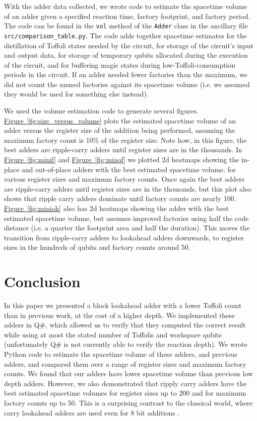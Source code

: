 \documentclass[onecolumn,unpublished]{quantumarticle}
\theoremstyle{definition}
\theoremstyle{definition}
\theoremstyle{definition}
\newcommand{\fig}[1]{\hyperref[fig:#1]{Figure~\ref*{fig:#1}}}
\begin{document}
With the adder data collected, we wrote code to estimate the spacetime volume of an adder given a specified reaction time, factory footprint, and factory period.
The code can be found in the \texttt{vol} method of the \texttt{Adder} class in the ancillary file \texttt{src/comparison\_table.py}.
The code adds together spacetime estimates for the distillation of Toffoli states needed by the circuit, for storage of the circuit's input and output data, for storage of temporary qubits allocated during the execution of the circuit, and for buffering magic states during low-Toffoli-consumption periods in the circuit.
If an adder needed fewer factories than the maximum, we did not count the unused factories against its spacetime volume (i.e. we assumed they would be used for something else instead).

We used the volume estimation code to generate several figures.
\fig{size_versus_volume} plots the estimated spacetime volume of an adder versus the register size of the addition being performed, assuming the maximum factory count is 10\% of the register size.
Note how, in this figure, the best adders are ripple-carry adders until register sizes are in the thousands.
In \fig{minif} and \fig{minof} we plotted 2d heatmaps showing the in-place and out-of-place adders with the best estimated spacetime volume, for various register sizes and maximum factory counts.
Once again the best adders are ripple-carry adders until register sizes are in the thousands, but this plot also shows that ripple carry adders dominate until factory counts are nearly 100.
\fig{minioh} also has 2d heatmaps showing the adder with the best estimated spacetime volume, but assumes improved factories using half the code distance (i.e. a quarter the footprint area and half the duration).
This moves the transition from ripple-carry adders to lookahead adders downwards, to register sizes in the hundreds of qubits and factory counts around 50.

\section{Conclusion}
\label{sec:conclusion}

In this paper we presented a block lookahead adder with a lower Toffoli count than in previous work, at the cost of a higher depth.
We implemented these adders in Q\#, which allowed us to verify that they computed the correct result while using at most the stated number of Toffolis and workspace qubits (unfortunately Q\# is not currently able to verify the reaction depth).
We wrote Python code to estimate the spacetime volume of these adders, and previous adders, and compared them over a range of register sizes and maximum factory counts.
We found that our adders have lower spacetime volume than previous low depth adders.
However, we also demonstrated that ripply carry adders have the best estimated spacetime volumes for register sizes up to 200 and for maximum factory counts up to 50.
This is a surprising contrast to the classical world, where carry lookahead adders are used even for 8 bit additions \cite{shirriff2020reverseengineer8008}.
\end{document}
